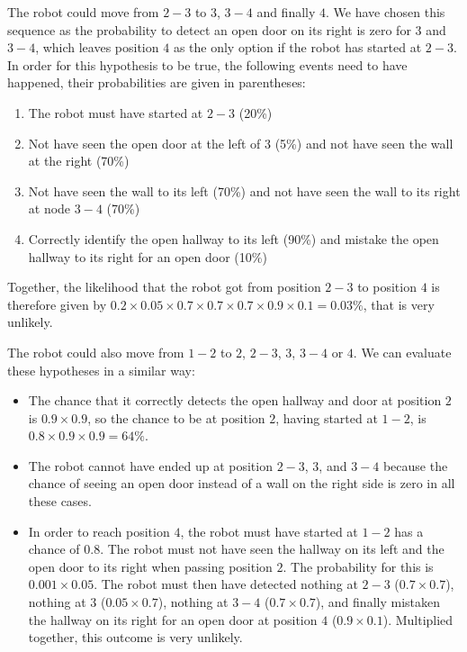 The robot could move from $2-3$ to $3$, $3-4$ and finally $4$. We have chosen this sequence as the probability to detect an open door on its right is zero for $3$ and $3-4$, which leaves position $4$ as the only option if the robot has started at $2-3$. In order for this hypothesis to be true, the following events need to have happened, their probabilities are given in parentheses:
\begin{enumerate}
\item The robot must have started at $2-3$ (20\%)
\item Not have seen the open door at the left of $3$ (5\%) and not have seen the wall at the right (70\%)
\item Not have seen the wall to its left (70\%) and not have seen the wall to its right at node $3-4$ (70\%)
\item Correctly identify the open hallway to its left (90\%) and mistake the open hallway to its right for an open door (10\%)
\end{enumerate}
Together, the likelihood that the robot got from position $2-3$ to position $4$ is therefore given by $0.2\times 0.05 \times 0.7 \times 0.7 \times 0.7 \times 0.9 \times0.1=0.03\%$, that is very unlikely.


The robot could also move from $1-2$ to $2$, $2-3$, $3$, $3-4$ or $4$. We can evaluate these hypotheses in a similar way:
\begin{itemize}
\item The chance that it correctly detects the open hallway and door at position $2$ is $0.9 \times 0.9$, so the chance to be at position $2$, having started at $1-2$, is $0.8 \times 0.9 \times 0.9=64\%$.
\item The robot cannot have ended up at position $2-3$, $3$, and $3-4$ because the chance of seeing an open door instead of a wall on the right side is zero in all these cases.
\item In order to reach position $4$, the robot must have started at $1-2$ has a chance of $0.8$. The robot must not have seen the hallway on its left and the open door to its right when passing position $2$. The probability for this is $0.001 \times 0.05$. The robot must then have detected nothing at $2-3$ ($0.7 \times 0.7$), nothing at $3$ ($0.05 \times 0.7$), nothing at $3-4$ ($0.7 \times 0.7$), and finally mistaken the hallway on its right for an open door at position $4$ ($0.9 \times 0.1$). Multiplied together, this outcome is very unlikely.
\end{itemize}

